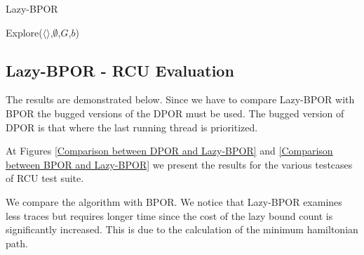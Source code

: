 \begin{algorithm}
    \caption{Lazy-BPOR}
    \label{Lazy-BPOR}
    Explore($\langle \rangle$,$\emptyset$,$G$,$b$)\;
\end{algorithm}



\subsection{Lazy-BPOR - RCU Evaluation}

The results are demonstrated below. Since we have to compare Lazy-BPOR with BPOR the bugged versions of the DPOR must be used. The bugged version
of DPOR is that where the last running thread is prioritized.

At Figures \ref{Comparison between DPOR and Lazy-BPOR} and \ref{Comparison between BPOR and Lazy-BPOR} we present the results for the various
testcases of RCU test suite.





We compare the algorithm with BPOR. We notice that Lazy-BPOR examines less traces but requires longer time since the cost of the lazy bound count is significantly
increased. This is due to the calculation of the minimum hamiltonian path.

